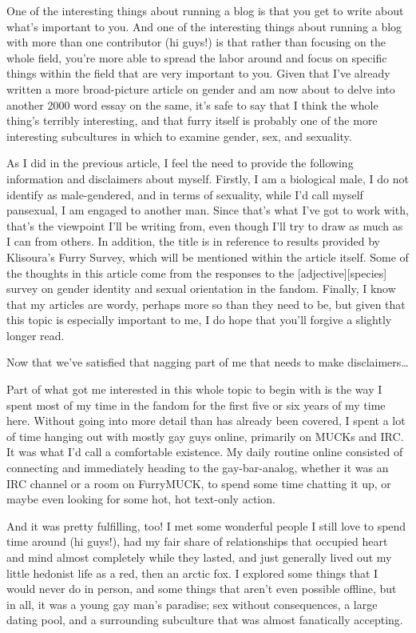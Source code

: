 
One of the interesting things about running a blog is that you get to write about what’s important to you.  And one of the interesting things about running a blog with more than one contributor (hi guys!) is that rather than focusing on the whole field, you’re more able to spread the labor around and focus on specific things within the field that are very important to you.  Given that I’ve already written a more broad-picture article on gender and am now about to delve into another 2000 word essay on the same, it’s safe to say that I think the whole thing’s terribly interesting, and that furry itself is probably one of the more interesting subcultures in which to examine gender, sex, and sexuality.

As I did in the previous article, I feel the need to provide the following information and disclaimers about myself.  Firstly, I am a biological male, I do not identify as male-gendered, and in terms of sexuality, while I’d call myself pansexual, I am engaged to another man.  Since that’s what I’ve got to work with, that’s the viewpoint I’ll be writing from, even though I’ll try to draw as much as I can from others. In addition, the title is in reference to results provided by Klisoura’s Furry Survey, which will be mentioned within the article itself.  Some of the thoughts in this article come from the responses to the [adjective][species] survey on gender identity and sexual orientation in the fandom. Finally, I know that my articles are wordy, perhaps more so than they need to be, but given that this topic is especially important to me, I do hope that you’ll forgive a slightly longer read.

Now that we’ve satisfied that nagging part of me that needs to make disclaimers…

Part of what got me interested in this whole topic to begin with is the way I spent most of my time in the fandom for the first five or six years of my time here.  Without going into more detail than has already been covered, I spent a lot of time hanging out with mostly gay guys online, primarily on MUCKs and IRC.  It was what I’d call a comfortable existence.  My daily routine online consisted of connecting and immediately heading to the gay-bar-analog, whether it was an IRC channel or a room on FurryMUCK, to spend some time chatting it up, or maybe even looking for some hot, hot text-only action.

And it was pretty fulfilling, too!  I met some wonderful people I still love to spend time around (hi guys!), had my fair share of relationships that occupied heart and mind almost completely while they lasted, and just generally lived out my little hedonist life as a red, then an arctic fox.  I explored some things that I would never do in person, and some things that aren’t even possible offline, but in all, it was a young gay man’s paradise; sex without consequences, a large dating pool, and a surrounding subculture that was almost fanatically accepting.

